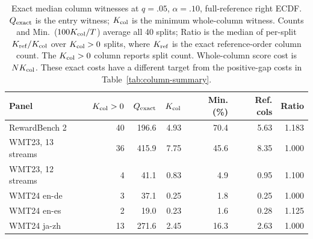 \begin{table}[t]
\centering\small


\begin{tabular}{lrrrrrr}
\toprule
Panel & $K_{\rm col}>0$ & $Q_{\rm exact}$ & $K_{\rm col}$ & Min. (\%) & Ref. cols & Ratio \\
\midrule
RewardBench 2 & 40 & 196.6 & 4.93 & 70.4 & 5.63 & 1.183 \\
WMT23, 13 streams & 36 & 415.9 & 7.75 & 45.6 & 8.35 & 1.000 \\
WMT23, 12 streams & 4 & 41.1 & 0.83 & 4.9 & 0.95 & 1.100 \\
WMT24 en-de & 3 & 37.1 & 0.25 & 1.8 & 0.25 & 1.000 \\
WMT24 en-es & 2 & 19.0 & 0.23 & 1.6 & 0.28 & 1.125 \\
WMT24 ja-zh & 13 & 271.6 & 2.45 & 16.3 & 2.63 & 1.000 \\
\bottomrule
\end{tabular}
\caption{Exact median column witnesses at $q=.05$, $\alpha=.10$, full-reference right ECDF. $Q_{\rm exact}$ is the entry witness; $K_{\rm col}$ is the minimum whole-column witness. Counts and Min.\ ($100K_{\rm col}/T$) average all 40 splits; Ratio is the median of per-split $K_{\rm ref}/K_{\rm col}$ over $K_{\rm col}>0$ splits, where $K_{\rm ref}$ is the exact reference-order column count. The $K_{\rm col}>0$ column reports split count. Whole-column score cost is $NK_{\rm col}$. These exact costs have a different target from the positive-gap costs in Table~\ref{tab:column-summary}.}
\label{tab:column-witness-summary}
\end{table}
